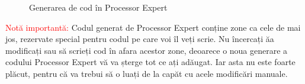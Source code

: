 \begin{figure}
  \vspace{-20pt}
  \vspace{-15pt}
  \caption{\label{fig:CodeWarrior-ProcessorExpertGenerate} Generarea de cod în Processor Expert}
  \vspace{-20pt}
\end{figure}

\textcolor{red}{Notă importantă:} Codul generat de Processor Expert conține zone ca cele de mai jos, rezervate special pentru codul pe care voi îl veți scrie. Nu încercați ăa modificați sau să scrieți cod în afara acestor zone, deoarece o noua generare a codului Processor Expert vă va șterge tot ce ați adăugat. Iar asta nu este foarte plăcut, pentru că va trebui să o luați de la capăt cu acele modificări manuale.

